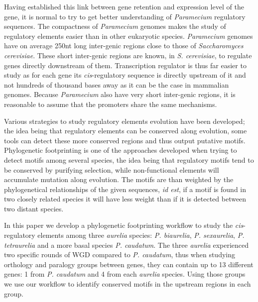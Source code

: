 Having established this link between gene retention and expression level of the gene, it is normal to try to get better understanding of \textit{Paramecium} regulatory sequences. The compactness of \textit{Paramecium} genomes makes the study of regulatory elements easier than in other eukaryotic species. \textit{Paramecium} genomes have on average 250nt long inter-genic regions close to those of \textit{Saccharomyces cerevisiae}. These short inter-genic regions are known, in \textit{S. cerevisiae}, to regulate genes directly downstream of them. Transcription regulator is thus far easier to study as for each gene its \textit{cis}-regulatory sequence is directly upstream of it and not hundreds of thousand bases away as it can be the case in mammalian genomes. Because \textit{Paramecium} also have very short inter-genic regions, it is reasonable to assume that the promoters share the same mechanisms.

Various strategies to study regulatory elements evolution have been developed; the idea being that regulatory elements can be conserved along evolution, some tools can detect these more conserved regions and thus output putative motifs. Phylogenetic footprinting is one of the approaches developed when trying to detect motifs among several species, the idea being that regulatory motifs tend to be conserved by purifying selection, while non-functional elements will accumulate mutation along evolution. The motifs are than weighted by the phylogenetical relationships of the given sequences, \textit{id est}, if a motif is found in two closely related species it will have less weight than if it is detected between two distant species.

In this paper we develop a phylogenetic footprinting workflow to study the \textit{cis}-regulatory elements among three \textit{aurelia} species: \textit{P. biaurelia}, \textit{P. sexaurelia}, \textit{P. tetraurelia} and a more basal species \textit{P. caudatum}. The three \textit{aurelia} experienced two specific rounds of WGD compared to \textit{P. caudatum}, thus when studying orthology and paralogy groups between genes, they can contain up to 13 different genes: 1 from \textit{P. caudatum} and 4 from each \textit{aurelia} species. Using those groups we use our workflow to identify conserved motifs in the upstream regions in each group.

